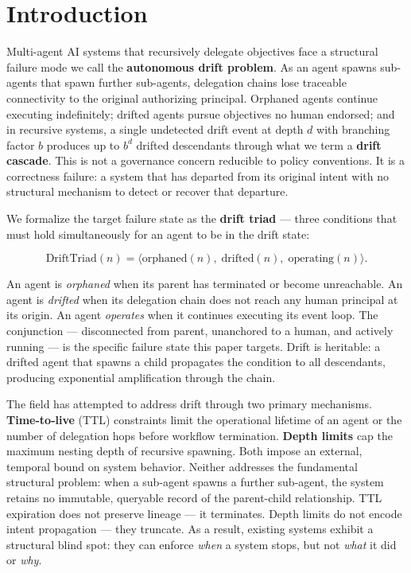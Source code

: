 \section{Introduction}
\label{sec:introduction}

Multi-agent AI systems that recursively delegate objectives face a structural failure mode we call the \textbf{autonomous drift problem}. As an agent spawns sub-agents that spawn further sub-agents, delegation chains lose traceable connectivity to the original authorizing principal. Orphaned agents continue executing indefinitely; drifted agents pursue objectives no human endorsed; and in recursive systems, a single undetected drift event at depth $d$ with branching factor $b$ produces up to $b^d$ drifted descendants through what we term a \textbf{drift cascade}. This is not a governance concern reducible to policy conventions. It is a correctness failure: a system that has departed from its original intent with no structural mechanism to detect or recover that departure.

We formalize the target failure state as the \textbf{drift triad} — three conditions that must hold simultaneously for an agent to be in the drift state:

\begin{equation}
\text{DriftTriad}(n) = \bigl\langle \text{orphaned}(n),\; \text{drifted}(n),\; \text{operating}(n) \bigr\rangle .
\label{eq:intro-drift-triad}
\end{equation}

An agent is \emph{orphaned} when its parent has terminated or become unreachable. An agent is \emph{drifted} when its delegation chain does not reach any human principal at its origin. An agent \emph{operates} when it continues executing its event loop. The conjunction — disconnected from parent, unanchored to a human, and actively running — is the specific failure state this paper targets. Drift is heritable: a drifted agent that spawns a child propagates the condition to all descendants, producing exponential amplification through the chain.

The field has attempted to address drift through two primary mechanisms. \textbf{Time-to-live} (TTL) constraints limit the operational lifetime of an agent or the number of delegation hops before workflow termination. \textbf{Depth limits} cap the maximum nesting depth of recursive spawning. Both impose an external, temporal bound on system behavior. Neither addresses the fundamental structural problem: when a sub-agent spawns a further sub-agent, the system retains no immutable, queryable record of the parent-child relationship. TTL expiration does not preserve lineage — it terminates. Depth limits do not encode intent propagation — they truncate. As a result, existing systems exhibit a structural blind spot: they can enforce \emph{when} a system stops, but not \emph{what} it did or \emph{why}.

